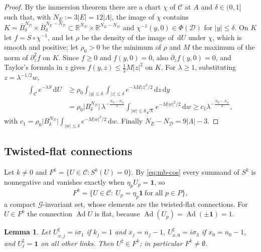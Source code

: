 \documentclass[11pt,a4paper]{amsart}
\newtheorem{lemma}[theorem]{Lemma}
\theoremstyle{definition}
\theoremstyle{remark}
\numberwithin{equation}{section}
\newcommand{\R}{\mathbb{R}}          %
\newcommand{\abs}[1]{\lvert #1\rvert}      %
\newcommand{\dd}{\,\mathrm{d}}             %
\begin{document}
\begin{proof}
By the immersion theorem there are a chart $\chi$ of $\mathcal C$ at $A$ and $\delta\in(0,1]$ such that, with $N_E:=3\abs E=12\abs\Lambda$, the image of $\chi$ contains $K=\bar B^{N_{\mathcal D}}_\delta\times\bar B^{N_E-N_{\mathcal D}}_\delta\subset\R^{N_{\mathcal D}}\times\R^{N_E-N_{\mathcal D}}$ and $\chi^{-1}(y,0)\in\Phi(\mathcal D)$ for $\abs y\le\delta$. On $K$ let $f=S\circ\chi^{-1}$, and let $\rho$ be the density of the image of $\dd U$ under $\chi$, which is smooth and positive; let $\rho_0>0$ be the minimum of $\rho$ and $M$ the maximum of the norm of $\partial_z^2f$ on $K$. Since $f\ge0$ and $f(y,0)=0$, also $\partial_zf(y,0)=0$, and Taylor's formula in $z$ gives $f(y,z)\le\frac12M\abs z^2$ on $K$. For $\lambda\ge1$, substituting $z=\lambda^{-1/2}w$,
\begin{align*}
\int_{\mathcal C}e^{-\lambda S}\dd U&\ge\rho_0\int_{\abs y\le\delta}\int_{\abs z\le\delta}e^{-\lambda M\abs z^2/2}\dd z\dd y\\
&=\rho_0\abs{B^{N_{\mathcal D}}_\delta}\,\lambda^{-\frac{N_E-N_{\mathcal D}}2}\int_{\abs w\le\delta\sqrt\lambda}e^{-M\abs w^2/2}\dd w\ge c_1\lambda^{-\frac{N_E-N_{\mathcal D}}2},
\end{align*}
with $c_1=\rho_0\abs{B^{N_{\mathcal D}}_\delta}\int_{\abs w\le\delta}e^{-M\abs w^2/2}\dd w$. Finally $N_E-N_{\mathcal D}=9\abs\Lambda-3$.
\end{proof}

\subsection{Twisted-flat connections}
Let $k\ne0$ and $F^k=\{U\in\mathcal C:S^k(U)=0\}$. By \eqref{eq:mb-cos} every summand of $S^k$ is nonnegative and vanishes exactly when $\eta_pU_p=\mathbf 1$, so
\[
F^k=\{U\in\mathcal C:\ U_p=\eta_p\mathbf 1\ \text{for all }p\in P\},
\]
a compact $\mathcal G$-invariant set, whose elements are the twisted-flat connections. For $U\in F^k$ the connection $\operatorname{Ad}U$ is flat, because $\operatorname{Ad}(U_p)=\operatorname{Ad}(\pm\mathbf 1)=1$.

\begin{lemma}\label{lem:mb-nonempty}
Let $U^\sharp_{x,j}=i\sigma_1$ if $k_j=1$ and $x_j=n_j-1$, $U^\sharp_{x,0}=i\sigma_3$ if $x_0=n_0-1$, and $U^\sharp_\ell=\mathbf 1$ on all other links. Then $U^\sharp\in F^k$; in particular $F^k\ne\emptyset$.
\end{lemma}
\end{document}
